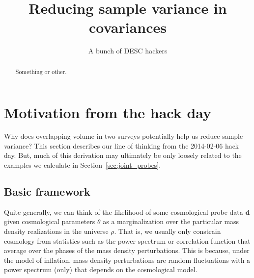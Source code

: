 \documentclass[preprint]{aastex}
\newcommand{\data}{\mathbf{d}}
\begin{document}
\title{Reducing sample variance in covariances}

\author{A bunch of DESC hackers}
\begin{abstract}
Something or other.
\end{abstract}

\section{Motivation from the hack day}

Why does overlapping volume in two surveys potentially help us reduce sample variance?
This section describes our line of thinking from the 2014-02-06 hack day. 
But, much of this derivation may ultimately be only loosely related to the examples
we calculate in Section~\ref{sec:joint_probes}.

\subsection{Basic framework}
Quite generally, we can think of the likelihood of some cosmological probe data $\data$ given cosmological 
parameters $\theta$ as a marginalization over the particular mass density realizations in the universe $\rho$.
That is, we usually only constrain cosmology from statistics such as the power spectrum or correlation 
function that average over the phases of the mass density perturbations. This is because, under the model 
of inflation, mass density perturbations are random fluctuations with a power spectrum (only) that depends 
on the cosmological model.
\end{document}
